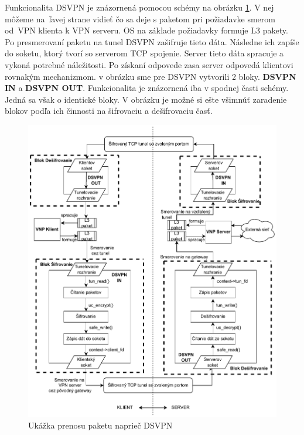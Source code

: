 Funkcionalita DSVPN je znázornená pomocou schémy na obrázku \ref{dsvpnarch}. V nej môžeme na~ľavej strane vidieť čo sa deje s paketom pri požiadavke smerom \\od~VPN klienta k VPN serveru. OS na základe požiadavky formuje L3 pakety. Po presmerovaní paketu na tunel DSVPN zašifruje tieto dáta. Následne ich zapíše do soketu, ktorý tvorí so serverom TCP spojenie. Server tieto dáta spracuje a vykoná potrebné náležitosti. Po získaní odpovede zasa server odpovedá klientovi rovnakým mechanizmom. v obrázku sme pre DSVPN vytvorili 2 bloky. \textbf{DSVPN IN} a \textbf{DSVPN OUT}. Funkcionalita je znázornená iba v spodnej časti schémy. Jedná sa však o identické bloky. V obrázku je možné si ešte všimnúť zaradenie blokov podľa ich činnosti na šifrovaciu a dešifrovaciu časť. 
\begin{figure}[h!]
	\centering
	\includegraphics[width=1.1\textwidth]{figures/dsvpn.pdf}
	\caption{Ukážka prenosu paketu naprieč DSVPN}
	\label{dsvpnarch}
\end{figure}


 
